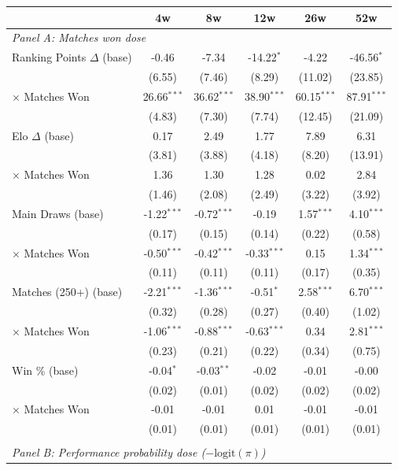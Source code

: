 \begin{tabular}{lccccc}
\toprule
 & 4w & 8w & 12w & 26w & 52w \\
\midrule
\multicolumn{6}{l}{\textit{Panel A: Matches won dose}} \\
\quad Ranking Points $\Delta$ (base) & -0.46 & -7.34 & -14.22$^{*}$ & -4.22 & -46.56$^{*}$ \\
 & (6.55) & (7.46) & (8.29) & (11.02) & (23.85) \\
\quad \quad $\times$ Matches Won & 26.66$^{***}$ & 36.62$^{***}$ & 38.90$^{***}$ & 60.15$^{***}$ & 87.91$^{***}$ \\
 & (4.83) & (7.30) & (7.74) & (12.45) & (21.09) \\[0.3em]
\quad Elo $\Delta$ (base) & 0.17 & 2.49 & 1.77 & 7.89 & 6.31 \\
 & (3.81) & (3.88) & (4.18) & (8.20) & (13.91) \\
\quad \quad $\times$ Matches Won & 1.36 & 1.30 & 1.28 & 0.02 & 2.84 \\
 & (1.46) & (2.08) & (2.49) & (3.22) & (3.92) \\[0.3em]
\quad Main Draws (base) & -1.22$^{***}$ & -0.72$^{***}$ & -0.19 & 1.57$^{***}$ & 4.10$^{***}$ \\
 & (0.17) & (0.15) & (0.14) & (0.22) & (0.58) \\
\quad \quad $\times$ Matches Won & -0.50$^{***}$ & -0.42$^{***}$ & -0.33$^{***}$ & 0.15 & 1.34$^{***}$ \\
 & (0.11) & (0.11) & (0.11) & (0.17) & (0.35) \\[0.3em]
\quad Matches (250+) (base) & -2.21$^{***}$ & -1.36$^{***}$ & -0.51$^{*}$ & 2.58$^{***}$ & 6.70$^{***}$ \\
 & (0.32) & (0.28) & (0.27) & (0.40) & (1.02) \\
\quad \quad $\times$ Matches Won & -1.06$^{***}$ & -0.88$^{***}$ & -0.63$^{***}$ & 0.34 & 2.81$^{***}$ \\
 & (0.23) & (0.21) & (0.22) & (0.34) & (0.75) \\[0.3em]
\quad Win \% (base) & -0.04$^{*}$ & -0.03$^{**}$ & -0.02 & -0.01 & -0.00 \\
 & (0.02) & (0.01) & (0.02) & (0.02) & (0.02) \\
\quad \quad $\times$ Matches Won & -0.01 & -0.01 & 0.01 & -0.01 & -0.01 \\
 & (0.01) & (0.01) & (0.01) & (0.01) & (0.01) \\[0.3em]
\\[0.5em]
\multicolumn{6}{l}{\textit{Panel B: Performance probability dose ($-\text{logit}(\pi)$)}} \\

\end{tabular}
